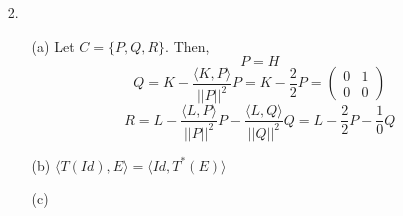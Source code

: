 \documentclass{article}
\begin{document}
\newpage

\begin{itemize}
	\item [2.]
	      \begin{itemize}
		      \item [(a)] Let $C=\{P,Q,R\}$. Then, \[P=H\]\[Q=K-\dfrac{\langle K,P\rangle}{||P||^2}P=K-\dfrac{2}{2}P=\begin{pmatrix}0&1\\0&0\end{pmatrix}\]\[R=L-\dfrac{\langle L,P\rangle}{||P||^2}P-\dfrac{\langle L,Q\rangle}{||Q||^2}Q=L-\dfrac{2}{2}P-\dfrac{1}{0}Q\]
		      \item [(b)] $\langle T(Id),E\rangle=\langle Id,T^*(E)\rangle$
		      \item [(c)]
	      \end{itemize}
\end{itemize}

\newpage
\end{document}
